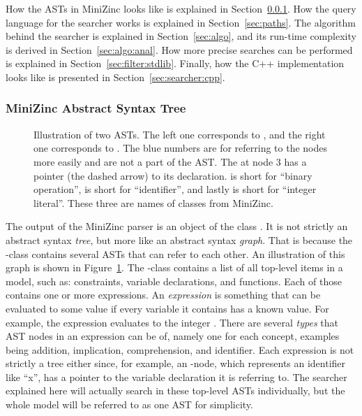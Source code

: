 \documentclass[a4paper,12pt]{article}
\begin{document}
How the ASTs in MiniZinc looks like is explained in Section~\ref{sec:searcher:ast}.
How the query language for the searcher works is explained in Section~\ref{sec:paths}.
The algorithm behind the searcher is explained in Section~\ref{sec:algo}, and its run-time complexity is
derived in Section~\ref{sec:algo:anal}.
How more precise searches can be performed is explained in Section~\ref{sec:filter:stdlib}.
Finally, how the C++ implementation looks like is presented in Section~\ref{sec:searcher:cpp}.

\subsubsection{MiniZinc Abstract Syntax Tree}\label{sec:searcher:ast}
\begin{figure}[t]
  \centering
  \newif\ifshowastnumbers\showastnumberstrue
  
  \caption{Illustration of two ASTs. The left one corresponds to ,
    and the right one corresponds to . The blue numbers are
    for referring to the nodes more easily and are not a part of the AST. The  at
    node 3 has a pointer (the dashed arrow) to its declaration.  is short for ``binary operation'',
     is short for ``identifier'', and lastly  is short for ``integer
    literal''. These three are names of classes from MiniZinc.}%
  \label{fig:ast:searcher}
\end{figure}

The output of the MiniZinc parser is an object of the class . It is not strictly
an abstract syntax \emph{tree}, but more like an abstract syntax
\emph{graph}. That is because the -class contains several ASTs that can refer to each other.
An illustration of this graph is shown in Figure~\ref{fig:ast:searcher}.
The -class contains a list of all top-level items in a model, such as: constraints, variable
declarations, and functions. Each of those contains one or more expressions. An \emph{expression} is
something that can be evaluated to some value if every variable it contains has a known value. 
For example, the expression  evaluates to the integer .
There are several \emph{types} that AST nodes in an expression can be of, namely one for each concept,
examples being addition, implication, comprehension, and identifier.
Each expression is not strictly a tree either since, for example,
an -node, which represents an identifier like ``x'', has a pointer to the variable
declaration it is referring to. The searcher explained here will actually search in these
top-level ASTs individually, but the whole model will be referred to as one AST for
simplicity.
\end{document}
